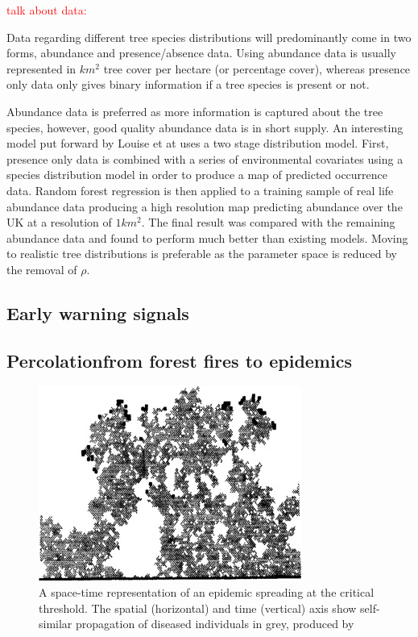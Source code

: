 \textcolor{red}{talk about data:}

Data regarding different tree species distributions will predominantly come in two forms, abundance and presence/absence data. Using abundance data is usually represented in $km^2$ tree cover per hectare (or percentage cover), whereas presence only data only gives binary information if a tree species is present or not.

Abundance data is preferred as more information is captured about the tree species, however, good quality abundance data is in short supply. An interesting model put forward by Louise et at \cite{2STAGE} uses a two stage distribution model. First, presence only data is combined with a series of environmental covariates using a species distribution model in order to produce a map of predicted occurrence data. Random forest regression is then applied to a training sample of real life abundance data producing a high resolution map predicting abundance over the UK at a resolution of $1km^2$. The final result was compared with the remaining abundance data and found to perform much better than existing models. Moving to realistic tree distributions is preferable as the parameter space is reduced by the removal of $\rho$.

\subsection{Early warning signals}
\label{section:ews}
\subsection{Percolation\textemdash from forest fires to epidemics}
\label{section:lit-rev-perc}
\begin{figure}
    \centering
    \includegraphics{chapter2/figures/perc1.jpg}
    \caption{A space-time representation of an epidemic spreading at the critical threshold. The spatial (horizontal) and time (vertical) axis show self-similar propagation of diseased individuals in grey, produced by \cite{GRASSBERGER1986273}}
    \label{fig:1d_perc_basis}
\end{figure}

